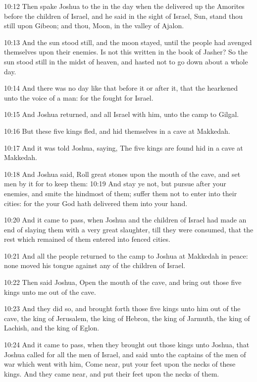 10:12 Then spake Joshua to the \LORD in the day when the \LORD delivered
up the Amorites before the children of Israel, and he said in the
sight of Israel, Sun, stand thou still upon Gibeon; and thou, Moon, in
the valley of Ajalon.

10:13 And the sun stood still, and the moon stayed, until the people
had avenged themselves upon their enemies. Is not this written in the
book of Jasher? So the sun stood still in the midst of heaven, and
hasted not to go down about a whole day.

10:14 And there was no day like that before it or after it, that the
\LORD hearkened unto the voice of a man: for the \LORD fought for
Israel.

10:15 And Joshua returned, and all Israel with him, unto the camp to
Gilgal.

10:16 But these five kings fled, and hid themselves in a cave at
Makkedah.

10:17 And it was told Joshua, saying, The five kings are found hid in
a cave at Makkedah.

10:18 And Joshua said, Roll great stones upon the mouth of the cave,
and set men by it for to keep them: 10:19 And stay ye not, but pursue
after your enemies, and smite the hindmost of them; suffer them not to
enter into their cities: for the \LORD your God hath delivered them
into your hand.

10:20 And it came to pass, when Joshua and the children of Israel had
made an end of slaying them with a very great slaughter, till they
were consumed, that the rest which remained of them entered into
fenced cities.

10:21 And all the people returned to the camp to Joshua at Makkedah in
peace: none moved his tongue against any of the children of Israel.

10:22 Then said Joshua, Open the mouth of the cave, and bring out
those five kings unto me out of the cave.

10:23 And they did so, and brought forth those five kings unto him out
of the cave, the king of Jerusalem, the king of Hebron, the king of
Jarmuth, the king of Lachish, and the king of Eglon.

10:24 And it came to pass, when they brought out those kings unto
Joshua, that Joshua called for all the men of Israel, and said unto
the captains of the men of war which went with him, Come near, put
your feet upon the necks of these kings. And they came near, and put
their feet upon the necks of them.


